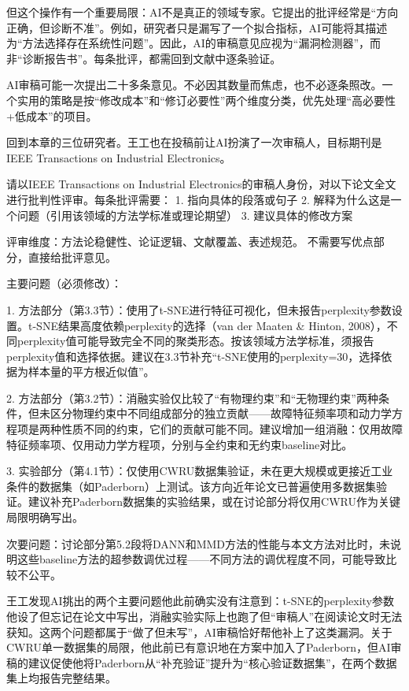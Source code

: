但这个操作有一个重要局限：AI不是真正的领域专家。它提出的批评经常是``方向正确，但诊断不准''。例如，研究者只是漏写了一个拟合指标，AI可能将其描述为``方法选择存在系统性问题''。因此，AI的审稿意见应视为``漏洞检测器''，而非``诊断报告书''。每条批评，都需回到文献中逐条验证。

AI审稿可能一次提出二十多条意见。不必因其数量而焦虑，也不必逐条照改。一个实用的策略是按``修改成本''和``修订必要性''两个维度分类，优先处理``高必要性+低成本''的项目。

\medskip
回到本章的三位研究者。王工也在投稿前让AI扮演了一次审稿人，目标期刊是IEEE Transactions on Industrial Electronics。

\begin{userbox}
请以IEEE Transactions on Industrial Electronics的审稿人身份，对以下论文全文进行批判性评审。每条批评需要：
1. 指向具体的段落或句子
2. 解释为什么这是一个问题（引用该领域的方法学标准或理论期望）
3. 建议具体的修改方案

评审维度：方法论稳健性、论证逻辑、文献覆盖、表述规范。
不需要写优点部分，直接给批评意见。
\end{userbox}

\begin{aibox}
主要问题（必须修改）：

1. 方法部分（第3.3节）：使用了t-SNE进行特征可视化，但未报告perplexity参数设置。t-SNE结果高度依赖perplexity的选择（van der Maaten \& Hinton, 2008），不同perplexity值可能导致完全不同的聚类形态。按该领域方法学标准，须报告perplexity值和选择依据。建议在3.3节补充``t-SNE使用的perplexity=30，选择依据为样本量的平方根近似值''。

2. 方法部分（第3.2节）：消融实验仅比较了``有物理约束''和``无物理约束''两种条件，但未区分物理约束中不同组成部分的独立贡献——故障特征频率项和动力学方程项是两种性质不同的约束，它们的贡献可能不同。建议增加一组消融：仅用故障特征频率项、仅用动力学方程项，分别与全约束和无约束baseline对比。

3. 实验部分（第4.1节）：仅使用CWRU数据集验证，未在更大规模或更接近工业条件的数据集（如Paderborn）上测试。该方向近年论文已普遍使用多数据集验证。建议补充Paderborn数据集的实验结果，或在讨论部分将仅用CWRU作为关键局限明确写出。

次要问题：讨论部分第5.2段将DANN和MMD方法的性能与本文方法对比时，未说明这些baseline方法的超参数调优过程——不同方法的调优程度不同，可能导致比较不公平。
\end{aibox}

\begin{critiquebox}
王工发现AI挑出的两个主要问题他此前确实没有注意到：t-SNE的perplexity参数他设了但忘记在论文中写出，消融实验实际上也跑了但``审稿人''在阅读论文时无法获知。这两个问题都属于``做了但未写''，AI审稿恰好帮他补上了这类漏洞。关于CWRU单一数据集的局限，他此前已有意识地在方案中加入了Paderborn，但AI审稿的建议促使他将Paderborn从``补充验证''提升为``核心验证数据集''，在两个数据集上均报告完整结果。
\end{critiquebox}

